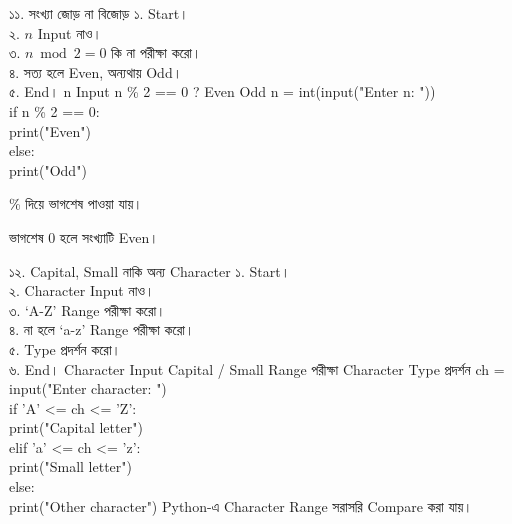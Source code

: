 
\exerciseTable
{১১. সংখ্যা জোড় না বিজোড়}
{
১. Start।\\
২. \(n\) Input নাও।\\
৩. \(n\bmod2=0\) কি না পরীক্ষা করো।\\
৪. সত্য হলে Even, অন্যথায় Odd।\\
৫. End।
}
{
\binaryflow
{n Input}
{n \% 2 == 0 ?}
{Even}
{Odd}
}
{
n = int(input("Enter n: "))\\[0.5mm]
if n \% 2 == 0:\\
\hspace*{4mm}print("Even")\\
else:\\
\hspace*{4mm}print("Odd")
}
{
\textenglish{\ttfamily \%}
দিয়ে ভাগশেষ পাওয়া যায়।

\medskip

ভাগশেষ 0 হলে সংখ্যাটি Even।
}


\exerciseTable
{১২. Capital, Small নাকি অন্য Character}
{
১. Start।\\
২. Character Input নাও।\\
৩. `A-Z' Range পরীক্ষা করো।\\
৪. না হলে `a-z' Range পরীক্ষা করো।\\
৫. Type প্রদর্শন করো।\\
৬. End।
}
{
\linearflow
{Character Input}
{Capital / Small Range পরীক্ষা}
{Character Type প্রদর্শন}
}
{
ch = input("Enter character: ")\\[0.5mm]
if 'A' <= ch <= 'Z':\\
\hspace*{4mm}print("Capital letter")\\
elif 'a' <= ch <= 'z':\\
\hspace*{4mm}print("Small letter")\\
else:\\
\hspace*{4mm}print("Other character")
}
{
Python-এ Character Range সরাসরি Compare করা যায়।
}



